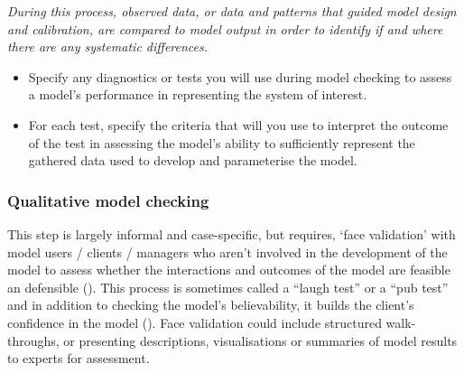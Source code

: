 \documentclass[
]{article}
\providecommand{\tightlist}{%
  \setlength{\itemsep}{0pt}\setlength{\parskip}{0pt}}
\begin{document}
\begin{tcolorbox}[enhanced jigsaw, opacitybacktitle=0.6, bottomrule=.15mm, leftrule=.75mm, rightrule=.15mm, colbacktitle=quarto-callout-caution-color!10!white, toprule=.15mm, titlerule=0mm, left=2mm, colframe=quarto-callout-caution-color-frame, breakable, title=\textcolor{quarto-callout-caution-color}{\faFire}\hspace{0.5em}{Preregistration Item}, opacityback=0, coltitle=black, bottomtitle=1mm, colback=white, toptitle=1mm, arc=.35mm]

\emph{During this process, observed data, or data and patterns that
guided model design and calibration, are compared to model output in
order to identify if and where there are any systematic differences.}

\begin{itemize}
\tightlist
\item[$\square$]
  Specify any diagnostics or tests you will use during model checking to
  assess a model's performance in representing the system of interest.
\item[$\square$]
  For each test, specify the criteria that will you use to interpret the
  outcome of the test in assessing the model's ability to sufficiently
  represent the gathered data used to develop and parameterise the
  model.
\end{itemize}

\end{tcolorbox}

\subsubsection{Qualitative model
checking}\label{qualitative-model-checking}

\begin{tcolorbox}[enhanced jigsaw, opacitybacktitle=0.6, bottomrule=.15mm, leftrule=.75mm, rightrule=.15mm, colbacktitle=quarto-callout-note-color!10!white, toprule=.15mm, titlerule=0mm, left=2mm, colframe=quarto-callout-note-color-frame, breakable, title=\textcolor{quarto-callout-note-color}{\faInfo}\hspace{0.5em}{Explanation}, opacityback=0, coltitle=black, bottomtitle=1mm, colback=white, toptitle=1mm, arc=.35mm]

This step is largely informal and case-specific, but requires‚ `face
validation' with model users / clients / managers who aren't involved in
the development of the model to assess whether the interactions and
outcomes of the model are feasible an defensible
(). This process is
sometimes called a ``laugh test'' or a ``pub test'' and in addition to
checking the model's believability, it builds the client's confidence in
the model (). Face
validation could include structured walk-throughs, or presenting
descriptions, visualisations or summaries of model results to experts
for assessment.

\end{tcolorbox}
\end{document}
